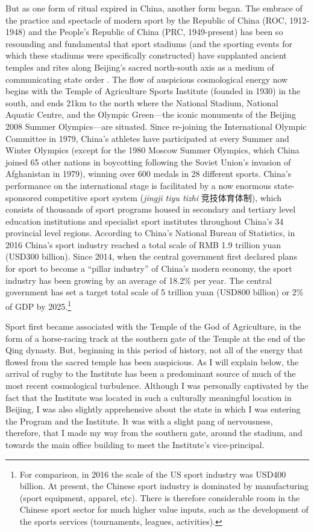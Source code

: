 \begin{CJK}{UTF8}{gbsn}
But as one form of ritual expired in China, another form began.
The embrace of the practice and spectacle of modern sport by the Republic of China (ROC, 1912-1948) and the People's Republic of China (PRC, 1949-present) has been so resounding and fundamental that sport stadiums (and the sporting events for which these stadiums were specifically constructed) have supplanted ancient temples and rites along Beijing's sacred north-south axis as a medium of communicating state order \citep{Brownell1995}.  The flow of auspicious cosmological energy now begins with the Temple of Agriculture Sports Institute (founded in 1930) in the south, and ends 21km to the north where the National Stadium, National Aquatic Centre, and the Olympic Green---the iconic monuments of the Beijing 2008 Summer Olympics---are situated.  Since re-joining the International Olympic Committee in 1979, China's athletes have participated at every Summer and Winter Olympics (except for the 1980 Moscow Summer Olympics, which China joined 65 other nations in boycotting following the Soviet Union's invasion of Afghanistan in 1979), winning over 600 medals in 28 different sports.  China's performance on the international stage is facilitated by a now enormous state-sponsored competitive sport system (\textit{jingji tiyu tizhi} 竞技体育体制), which consists of thousands of sport programs housed in secondary and tertiary level education institutions and specialist sport institutes throughout China's 34 provincial level regions.  According to China's National Bureau of Statistics, in 2016 China's sport industry reached a total scale of RMB 1.9 trillion yuan (USD300 billion).  Since 2014, when the central government first declared plans for sport to become a ``pillar industry'' of China's modern economy, the sport industry has been growing by an average of 18.2\% per year.  The central government has set a target total scale of 5 trillion yuan (USD800 billion) or 2\% of GDP by 2025.\footnote{For comparison, in 2016 the scale of the US sport industry was USD400 billion. At present, the Chinese sport industry is dominated by manufacturing (sport equipment, apparel, etc).  There is therefore considerable room in the Chinese sport sector for much higher value inputs, such as the development of the sports services (tournaments, leagues, activities).}

Sport first became associated with the Temple of the God of Agriculture, in the form of a horse-racing track at the southern gate of the Temple at the end of the Qing dynasty. But, beginning in this period of history, not all of the energy that flowed from the sacred temple has been auspicious.  As I will explain below, the arrival of rugby to the Institute has been a predominant source of much of the most recent cosmological turbulence.  Although I was personally captivated by the fact that the Institute was located in such a culturally meaningful location in Beijing, I was also slightly apprehensive about the state in which I was entering the Program and the Institute.  It was with a slight pang of nervousness, therefore, that I made my way from the southern gate, around the stadium, and towards the main office building to meet the Institute's vice-principal.


\end{CJK}
